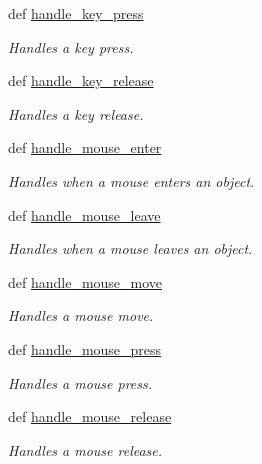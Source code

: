 \begin{DoxyCompactItemize}
\item 
def \hyperlink{classcs110graphics_1_1EventHandler_af3fb3531d0b23f1430a830586cd07906}{handle\_\-key\_\-press}
\begin{DoxyCompactList}\small\item\em Handles a key press. \item\end{DoxyCompactList}\item 
def \hyperlink{classcs110graphics_1_1EventHandler_a2849f60251baa44252992162521f2473}{handle\_\-key\_\-release}
\begin{DoxyCompactList}\small\item\em Handles a key release. \item\end{DoxyCompactList}\item 
def \hyperlink{classcs110graphics_1_1EventHandler_a13af3268f8a1aa36b8483eb2deffef15}{handle\_\-mouse\_\-enter}
\begin{DoxyCompactList}\small\item\em Handles when a mouse enters an object. \item\end{DoxyCompactList}\item 
def \hyperlink{classcs110graphics_1_1EventHandler_a5deaf2b6b8055e97ac0ddf6603132c64}{handle\_\-mouse\_\-leave}
\begin{DoxyCompactList}\small\item\em Handles when a mouse leaves an object. \item\end{DoxyCompactList}\item 
def \hyperlink{classcs110graphics_1_1EventHandler_a521fdcd170d15c0b8baa124c78b6d1ef}{handle\_\-mouse\_\-move}
\begin{DoxyCompactList}\small\item\em Handles a mouse move. \item\end{DoxyCompactList}\item 
def \hyperlink{classcs110graphics_1_1EventHandler_a547873123ebcd3fcc63a2e03d2a2fee3}{handle\_\-mouse\_\-press}
\begin{DoxyCompactList}\small\item\em Handles a mouse press. \item\end{DoxyCompactList}\item 
def \hyperlink{classcs110graphics_1_1EventHandler_a320a7dbf68d37e0101b237bff1713088}{handle\_\-mouse\_\-release}
\begin{DoxyCompactList}\small\item\em Handles a mouse release. \item\end{DoxyCompactList}\end{DoxyCompactItemize}


